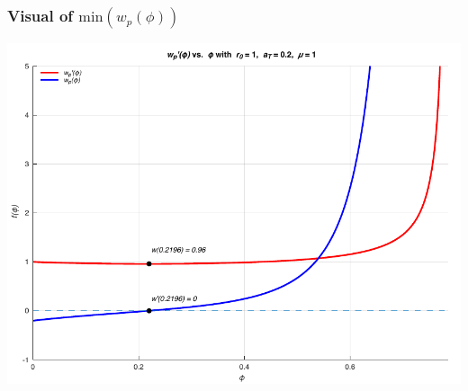 \documentclass{beamer}
\begin{document}
\begin{frame}
    \frametitle{Visual of $\text{min}(w_p(\phi))$}

    \begin{center}
        \includegraphics[scale=0.7]{plots/partC_r.pdf}
    \end{center}
\end{frame}
\end{document}
